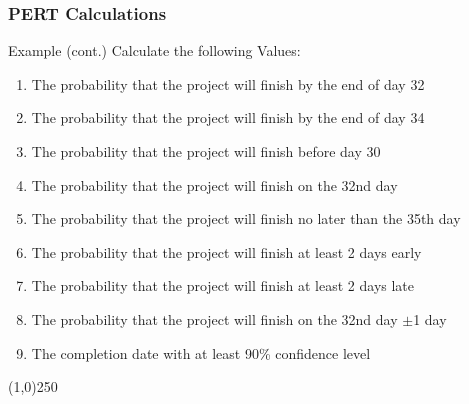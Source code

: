 \begin{frame}
\frametitle{PERT Calculations}
Example (cont.)
Calculate the following Values:
\begin{enumerate}
	\item The probability that the project will finish by the end of day 32
	\item The probability that the project will finish by the end of day 34
	\item The probability that the project will finish before day 30
	\item The probability that the project will finish on the 32nd day
	\item The probability that the project will finish no later than the 35th day
	\item The probability that the project will finish at least 2 days early
	\item The probability that the project will finish at least 2 days late
	\item The probability that the project will finish on the 32nd day  $\pm$1 day
	\item The completion date with at least 90\% confidence level
\end{enumerate}



\end{frame}
\begin{center}\line(1,0){250}\end{center}



